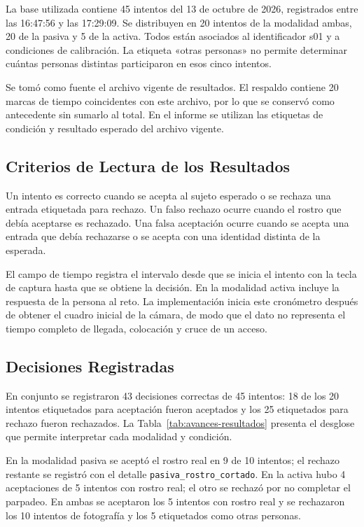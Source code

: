 La base utilizada contiene 45 intentos del 13 de octubre de 2026, registrados
entre las 16:47:56 y las 17:29:09. Se distribuyen en 20 intentos de la modalidad
ambas, 20 de la pasiva y 5 de la activa. Todos están asociados al identificador
s01 y a condiciones de calibración. La etiqueta «otras personas» no permite
determinar cuántas personas distintas participaron en esos cinco intentos.

Se tomó como fuente el archivo vigente de resultados. El respaldo contiene
20 marcas de tiempo coincidentes con este archivo, por lo que se conservó
como antecedente sin sumarlo al total. En el informe se utilizan las
etiquetas de condición y resultado esperado del archivo vigente.

\subsection{Criterios de Lectura de los Resultados}
Un intento es correcto cuando se acepta al sujeto esperado o se rechaza una
entrada etiquetada para rechazo. Un falso rechazo ocurre cuando el rostro
que debía aceptarse es rechazado. Una falsa aceptación ocurre cuando se
acepta una entrada que debía rechazarse o se acepta con una identidad
distinta de la esperada.

El campo de tiempo registra el intervalo desde que se inicia el intento con
la tecla de captura hasta que se obtiene la decisión. En la modalidad activa
incluye la respuesta de la persona al reto. La implementación inicia este
cronómetro después de obtener el cuadro inicial de la cámara, de modo que
el dato no representa el tiempo completo de llegada, colocación y cruce de
un acceso.

\subsection{Decisiones Registradas}
En conjunto se registraron 43 decisiones correctas de 45 intentos: 18 de los
20 intentos etiquetados para aceptación fueron aceptados y los 25
etiquetados para rechazo fueron rechazados. La
Tabla~\ref{tab:avances-resultados} presenta el desglose que permite
interpretar cada modalidad y condición.



En la modalidad pasiva se aceptó el rostro real en 9 de 10 intentos; el
rechazo restante se registró con el detalle
\texttt{pasiva\_rostro\_cortado}. En la activa hubo 4 aceptaciones de
5 intentos con rostro real; el otro se rechazó por no completar el parpadeo.
En ambas se aceptaron los 5 intentos con rostro real y se rechazaron los
10 intentos de fotografía y los 5 etiquetados como otras personas.

